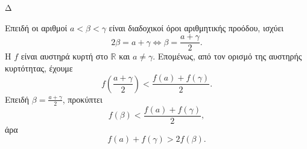 \begin{thema}{Δ}
\begin{erwthma}
\item Επειδή οι αριθμοί $a<\beta<\gamma$ είναι διαδοχικοί όροι αριθμητικής προόδου, ισχύει
\[
2\beta=a+\gamma
\Leftrightarrow
\beta=\frac{a+\gamma}{2}.
\]
Η $f$ είναι αυστηρά κυρτή στο $\mathbb{R}$ και $a\neq\gamma$. Επομένως, από τον ορισμό της αυστηρής κυρτότητας, έχουμε
\[
f\left(\frac{a+\gamma}{2}\right)
<\frac{f(a)+f(\gamma)}{2}.
\]
Επειδή $\beta=\frac{a+\gamma}{2}$, προκύπτει
\[
f(\beta)<\frac{f(a)+f(\gamma)}{2},
\]
άρα
\[
{f(a)+f(\gamma)>2f(\beta)}.
\]
\end{erwthma}
\end{thema}
